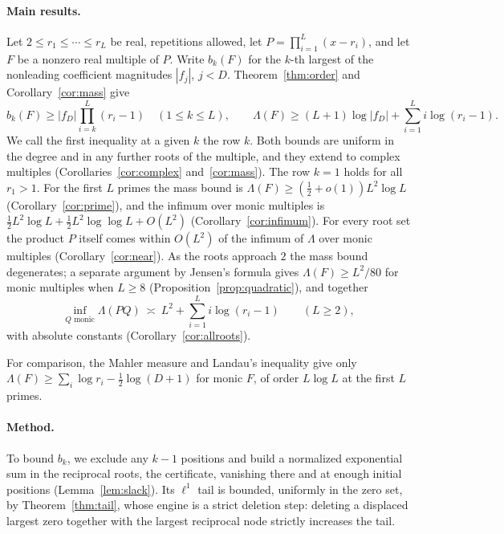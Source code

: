 \documentclass[11pt]{article}
\begin{document}
\paragraph{Main results.}
Let $2\le r_1\le\cdots\le r_L$ be real, repetitions allowed, let
$P=\prod_{i=1}^L(x-r_i)$, and let $F$ be a nonzero real multiple of $P$.
Write $b_k(F)$ for the $k$-th largest of the nonleading coefficient
magnitudes $|f_j|$, $j<D$.  Theorem~\ref{thm:order} and
Corollary~\ref{cor:mass} give
\[
  b_k(F)\ge|f_D|\prod_{i=k}^{L}(r_i-1)
  \quad(1\le k\le L),
  \qquad
  \Lambda(F)\ge(L+1)\log|f_D|+\sum_{i=1}^{L}i\log(r_i-1).
\]
We call the first inequality at a given $k$ the row $k$.  Both bounds are
uniform in the degree and in any further roots of the multiple, and they
extend to complex multiples (Corollaries~\ref{cor:complex} and~\ref{cor:mass}).  The row $k=1$
holds for all $r_1>1$.  For the first $L$ primes the mass bound is
$\Lambda(F)\ge(\frac12+o(1))L^2\log L$ (Corollary~\ref{cor:prime}), and the
infimum over monic multiples is
$\frac12L^2\log L+\frac12L^2\log\log L+O(L^2)$ (Corollary~\ref{cor:infimum}).
For every root set the product $P$ itself comes within $O(L^2)$ of the
infimum of $\Lambda$ over monic multiples (Corollary~\ref{cor:near}).  As
the roots approach $2$ the mass bound degenerates; a separate argument by
Jensen's formula gives $\Lambda(F)\ge L^2/80$ for monic multiples when
$L\ge8$ (Proposition~\ref{prop:quadratic}), and together
\[
  \inf_{Q\text{ monic}}\Lambda(PQ)\ \asymp\ L^2+\sum_{i=1}^Li\log(r_i-1)
  \qquad(L\ge2),
\]
with absolute constants (Corollary~\ref{cor:allroots}).

For comparison, the Mahler measure and Landau's inequality give only
$\Lambda(F)\ge\sum_i\log r_i-\frac12\log(D+1)$ for monic $F$, of order
$L\log L$ at the first $L$ primes.

\paragraph{Method.}
To bound $b_k$, we exclude any $k-1$ positions and build a normalized
exponential sum in the reciprocal roots, the certificate, vanishing there
and at enough initial positions (Lemma~\ref{lem:slack}).  Its $\ell^1$ tail
is bounded, uniformly in the zero set, by Theorem~\ref{thm:tail}, whose
engine is a strict deletion step: deleting a displaced largest zero together
with the largest reciprocal node strictly increases the tail.
\end{document}

